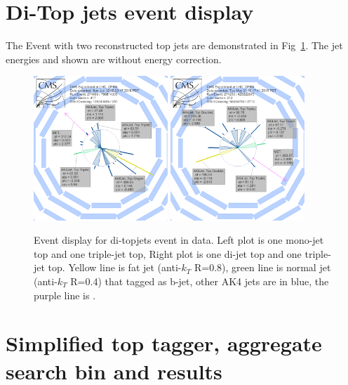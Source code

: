 \section{Di-Top jets event display}
The Event with two reconstructed top jets are demonstrated in Fig~\ref{fig:appttevtdisplay}. The jet energies and \MET shown are without energy correction.
\begin{figure}[htbp]
 \begin{center}
  \includegraphics[width=0.45\textwidth]{figures/appendix/Run2016B_1j3j-274969_766814305_417_RhoPhi.png}
  \includegraphics[width=0.45\textwidth]{figures/appendix/Run2016B_2j3j-274250_425322875_212_RhoPhi.png}
\end{center} \caption{Event display for di-topjets event in data. Left plot is one mono-jet top and one triple-jet top, Right plot is one di-jet top and one triple-jet top. Yellow line is fat jet (anti-$k_{T}$ R=0.8), green line is normal jet (anti-$k_{T}$ R=0.4) that tagged as b-jet, other AK4 jets are in blue, the purple line is \MET.}
 \label{fig:appttevtdisplay}
\end{figure}

\clearpage
\section{Simplified top tagger, aggregate search bin and results}

